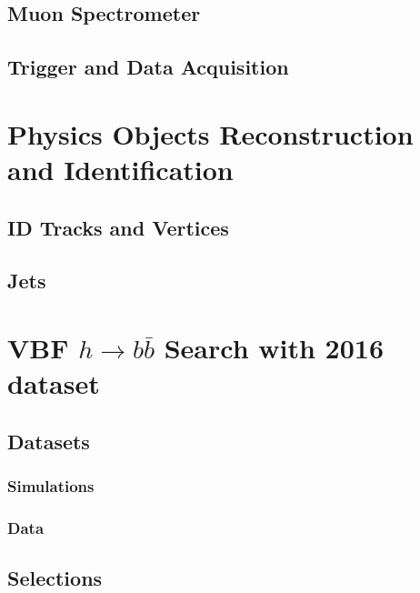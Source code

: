 \documentclass{report}
\begin{document}
\section{Muon Spectrometer}


\section{Trigger and Data Acquisition}


\chapter{Physics Objects Reconstruction and Identification}
\label{chap:reconstruction}


\section{ID Tracks and Vertices}


\section{Jets}

\clearpage

\chapter{VBF $h\rightarrow b\bar{b}$ Search with 2016 dataset}
\label{chap:vbf}

\clearpage

\section{Datasets}
\subsection{Simulations}

\subsection{Data}

\clearpage

\section{Selections}
\end{document}
